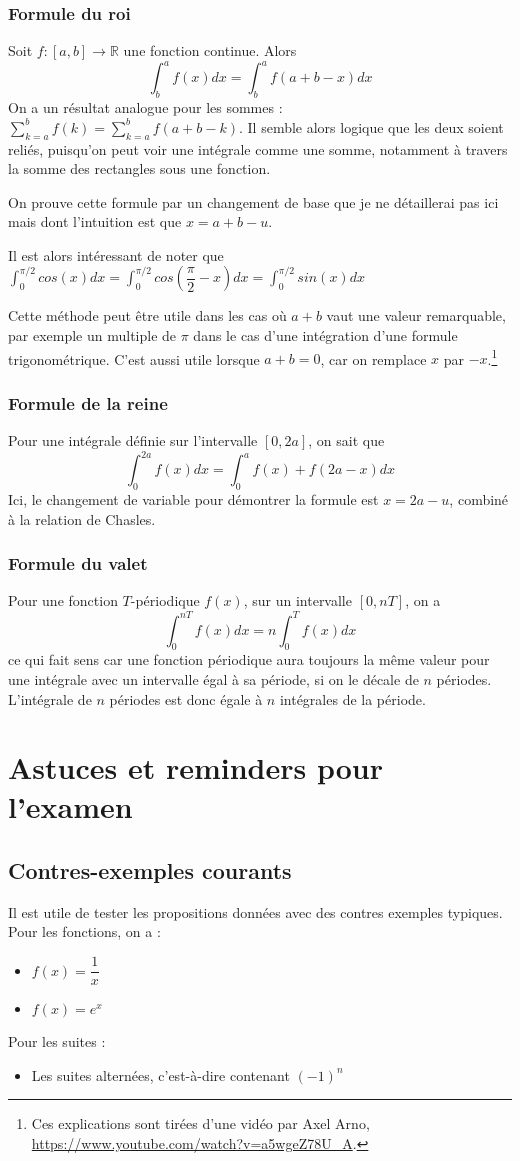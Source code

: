 \documentclass[10pt,a4paper]{book}
\newcommand{\R}{\mathbb{R}}
\begin{document}
\subsection{Formule du roi}
Soit $f:[a,b]\to\R$ une fonction continue. Alors 
\[\int^a_b f(x) dx = \int^a_b f(a+b-x) dx\]
On a un résultat analogue pour les sommes : $\sum^b_{k=a} f(k) = \sum^b_{k=a} f(a+b-k)$. Il semble alors logique que les deux soient reliés, puisqu'on peut voir une intégrale comme une somme, notamment à travers la somme des rectangles sous une fonction.\par 
On prouve cette formule par un changement de base que je ne détaillerai pas ici mais dont l'intuition est que $x=a+b-u$.\par 
Il est alors intéressant de noter que $\int^{\pi/2}_0 cos(x)dx = \int^{\pi/2}_0 cos(\dfrac{\pi}{2}-x)dx = \int^{\pi/2}_0 sin(x)dx$\par 
Cette méthode peut être utile dans les cas où $a+b$ vaut une valeur remarquable, par exemple un multiple de $\pi$ dans le cas d'une intégration d'une formule trigonométrique. C'est aussi utile lorsque $a+b=0$, car on remplace $x$ par $-x$.\footnote{Ces explications sont tirées d'une vidéo par Axel Arno, \url{https://www.youtube.com/watch?v=a5wgeZ78U_A}.}

\subsection{Formule de la reine}
Pour une intégrale définie sur l'intervalle $[0,2a]$, on sait que 
\[\int^{2a}_0 f(x)dx = \int^{a}_0 f(x)+f(2a-x)dx \]
Ici, le changement de variable pour démontrer la formule est $x=2a-u$, combiné à la relation de Chasles.

\subsection{Formule du valet}
Pour une fonction $T$-périodique $f(x)$, sur un intervalle $[0,nT]$, on a
\[\int^{nT}_0 f(x)dx = n\int^T_0 f(x)dx\]
ce qui fait sens car une fonction périodique aura toujours la même valeur pour une intégrale avec un intervalle égal à sa période, si on le décale de $n$ périodes. L'intégrale de $n$ périodes est donc égale à $n$ intégrales de la période.

\chapter{Astuces et reminders pour l'examen}
\section{Contres-exemples courants}
Il est utile de tester les propositions données avec des contres exemples typiques. Pour les fonctions, on a :
\begin{itemize}
\item $f(x) = \dfrac{1}{x}$
\item $f(x) = e^x$
\end{itemize}
Pour les suites :
\begin{itemize}
\item Les suites alternées, c'est-à-dire contenant $(-1)^n$
\end{itemize}
\end{document}
